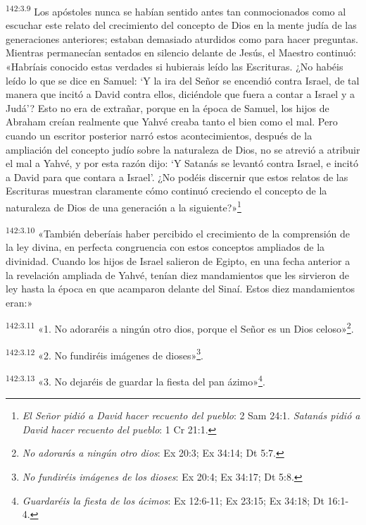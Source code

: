\par 
\textsuperscript{142:3.9} Los apóstoles nunca se habían sentido antes tan conmocionados como al escuchar este relato del crecimiento del concepto de Dios en la mente judía de las generaciones anteriores; estaban demasiado aturdidos como para hacer preguntas. Mientras permanecían sentados en silencio delante de Jesús, el Maestro continuó: «Habríais conocido estas verdades si hubierais leído las Escrituras. ¿No habéis leído lo que se dice en Samuel: `Y la ira del Señor se encendió contra Israel, de tal manera que incitó a David contra ellos, diciéndole que fuera a contar a Israel y a Judá'? Esto no era de extrañar, porque en la época de Samuel, los hijos de Abraham creían realmente que Yahvé creaba tanto el bien como el mal. Pero cuando un escritor posterior narró estos acontecimientos, después de la ampliación del concepto judío sobre la naturaleza de Dios, no se atrevió a atribuir el mal a Yahvé, y por esta razón dijo: `Y Satanás se levantó contra Israel, e incitó a David para que contara a Israel'. ¿No podéis discernir que estos relatos de las Escrituras muestran claramente cómo continuó creciendo el concepto de la naturaleza de Dios de una generación a la siguiente?»\footnote{\textit{El Señor pidió a David hacer recuento del pueblo}: 2 Sam 24:1. \textit{Satanás pidió a David hacer recuento del pueblo}: 1 Cr 21:1.}

\par 
\textsuperscript{142:3.10} «También deberíais haber percibido el crecimiento de la comprensión de la ley divina, en perfecta congruencia con estos conceptos ampliados de la divinidad. Cuando los hijos de Israel salieron de Egipto, en una fecha anterior a la revelación ampliada de Yahvé, tenían diez mandamientos que les sirvieron de ley hasta la época en que acamparon delante del Sinaí. Estos diez mandamientos eran:»

\par 
\textsuperscript{142:3.11} «1. No adoraréis a ningún otro dios, porque el Señor es un Dios celoso»\footnote{\textit{No adorarás a ningún otro dios}: Ex 20:3; Ex 34:14; Dt 5:7.}.

\par 
\textsuperscript{142:3.12} «2. No fundiréis imágenes de dioses»\footnote{\textit{No fundiréis imágenes de los dioses}: Ex 20:4; Ex 34:17; Dt 5:8.}.

\par 
\textsuperscript{142:3.13} «3. No dejaréis de guardar la fiesta del pan ázimo»\footnote{\textit{Guardaréis la fiesta de los ácimos}: Ex 12:6-11; Ex 23:15; Ex 34:18; Dt 16:1-4.}.

